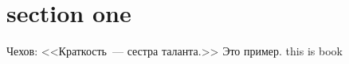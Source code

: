 \documentclass{report}
\begin{document}
\section{section one}
\label{sec:cheh} Чехов: <<Краткость~--- сестра таланта.>> Это пример.
 this is book
\\
\makeindex
\printindex
\end{document}
